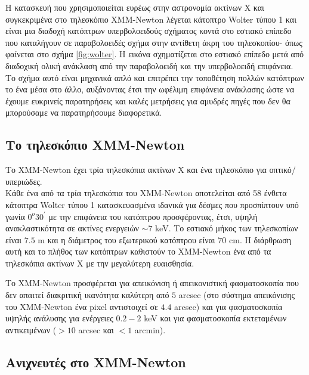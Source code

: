 Η κατασκευή που χρησιμοποιείται ευρέως στην αστρονομία ακτίνων Χ και συγκεκριμένα στο τηλεσκόπιο \textlatin{XMM-Newton} λέγεται κάτοπτρο \textlatin{Wolter} τύπου 1 και είναι μια διαδοχή κατόπτρων υπερβολοειδούς σχήματος κοντά στο εστιακό επίπεδο που καταλήγουν σε παραβολοειδές σχήμα στην αντίθετη άκρη του τηλεσκοπίου- όπως φαίνεται στο σχήμα \ref{fig:wolter}. Η εικόνα σχηματίζεται στο εστιακό επίπεδο μετά από διαδοχική ολική ανάκλαση από την παραβολοειδή και την υπερβολοειδή επιφάνεια. Το σχήμα αυτό είναι μηχανικά απλό και επιτρέπει την τοποθέτηση πολλών κατόπτρων το ένα μέσα στο άλλο, αυξάνοντας έτσι την ωφέλιμη επιφάνεια ανάκλασης ώστε να έχουμε ευκρινείς παρατηρήσεις και καλές μετρήσεις για αμυδρές πηγές που δεν θα μπορούσαμε να παρατηρήσουμε διαφορετικά. 

\subsection{Το τηλεσκόπιο \textlatin{XMM-Νewton}}

Το \textlatin{XMM-Νewton} έχει τρία τηλεσκόπια ακτίνων Χ και ένα τηλεσκόπιο για οπτικό/ υπεριώδες.\\
Κάθε ένα από τα τρία τηλεσκόπια του \textlatin{XMM-Newton} αποτελείται από 58 ένθετα κάτοπτρα \textlatin{Wolter} τύπου 1 κατασκευασμένα ιδανικά για δέσμες που προσπίπτουν υπό γωνία ${0^ο} {30^\prime}$ με την επιφάνεια του κατόπτρου προσφέροντας, έτσι, υψηλή ανακλαστικότητα σε ακτίνες ενεργειών $\sim 7$ \textlatin{keV}. Το εστιακό μήκος των τηλεσκοπίων είναι $7.5$ \textlatin{m} και η διάμετρος του εξωτερικού κατόπτρου είναι $70$ \textlatin{cm}. Η διάρθρωση αυτή και το πλήθος των κατόπτρων καθιστούν το \textlatin{XMM-Newton} ένα από τα τηλεσκόπια ακτίνων Χ με την μεγαλύτερη ευαισθησία.
  
Το \textlatin{XMM-Newton} προσφέρεται για απεικόνιση ή απεικονιστική φασματοσκοπία που δεν απαιτεί διακριτική ικανότητα καλύτερη από $5$ \textlatin{arcsec} (στο σύστημα απεικόνισης του \textlatin{XMM-Newton} ένα \textlatin{pixel} αντιστοιχεί σε $4.4$ \textlatin{arcsec}) και για φασματοσκοπία υψηλής ανάλυσης για ενέργειες $0.2- 2$ \textlatin{keV} και για φασματοσκοπία εκτεταμένων αντικειμένων ($>10$ \textlatin{arcsec} και $< 1$ \textlatin{arcmin}).

\subsection{Ανιχνευτές στο \textlatin{XMM-Νewton}}
  
